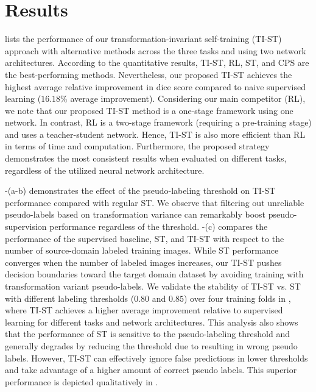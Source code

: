\section{Results}
\label{sec:experimental_results_tist}



 lists the performance of our transformation-invariant self-training (TI-ST) approach with alternative methods across the three tasks and using two network architectures. According to the quantitative results, TI-ST, RL, ST, and CPS are the best-performing methods. Nevertheless, our proposed TI-ST achieves the highest average relative improvement in dice score compared to naive supervised learning ($16.18\%$ average improvement). Considering our main competitor (RL), we note that our proposed TI-ST method is a one-stage framework using one network. In contrast, RL is a two-stage framework (requiring a pre-training stage) and uses a teacher-student network. Hence, TI-ST is also more efficient than RL in terms of time and computation.  Furthermore, the proposed strategy demonstrates the most consistent results when evaluated on different tasks, regardless of the utilized neural network architecture. 


-(a-b) demonstrates the effect of the pseudo-labeling threshold on TI-ST performance compared with regular ST. We observe that filtering out unreliable pseudo-labels based on transformation variance can remarkably boost pseudo-supervision performance regardless of the threshold. -(c) compares the performance of the supervised baseline, ST, and TI-ST with respect to the number of source-domain labeled training images. While ST performance converges when the number of labeled images increases, our TI-ST pushes decision boundaries toward the target domain dataset by avoiding training with transformation variant pseudo-labels. We validate the stability of TI-ST vs. ST  with different labeling thresholds ($0.80$ and $0.85$) over four training folds in , where TI-ST achieves a higher average improvement relative to supervised learning for different tasks and network architectures. This analysis also shows that the performance of ST is sensitive to the pseudo-labeling threshold and generally degrades by reducing the threshold due to resulting in wrong pseudo labels. However, TI-ST can effectively ignore false predictions in lower thresholds and take advantage of a higher amount of correct pseudo labels. This superior performance is depicted qualitatively in .


